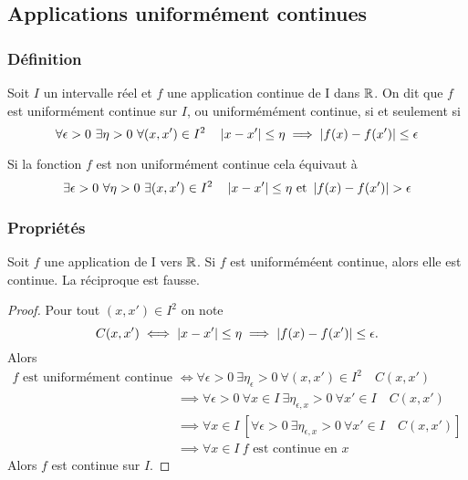 \subsection{Applications uniformément continues}

\subsubsection{Définition}

\begin{defdef}
  Soit $I$ un intervalle réel et $f$ une application continue de I dans $\mathbb{R}$. On dit que $f$ est uniformément continue sur $I$, ou uniformémément continue, si et seulement si
  \begin{equation}
    \forall \epsilon > 0 \ \exists \eta > 0 \ \forall (x,x') \in I^2 \quad \abs{x-x'} \leq \eta \implies \abs{f(x)-f(x')} \leq \epsilon
  \end{equation}
\end{defdef}
Si la fonction $f$ est non uniformément continue cela équivaut à
\begin{equation}
  \exists \epsilon > 0 \ \forall \eta > 0 \ \exists (x,x') \in I^2 \quad \abs{x-x'} \leq \eta \text{~et~} \abs{f(x)-f(x')} > \epsilon
\end{equation}

\subsubsection{Propriétés}

\begin{theo}
  Soit $f$ une application de I vers $\mathbb{R}$. Si $f$ est uniforméméent continue, alors elle est continue. La réciproque est fausse.
\end{theo}
\begin{proof}
  Pour tout $(x,x') \in I^2$ on note
  \begin{equation}
    C(x,x') \iff \left\lvert x-x'\right\rvert \leq \eta \implies \left\lvert f(x)-f(x')\right\rvert \leq \epsilon.
  \end{equation}
  Alors
  \begin{align}
    f \text{~est uniformément continue} &\iff \forall \epsilon > 0 \ \exists \eta_{\epsilon} > 0 \ \forall (x,x') \in I^2 \quad C(x,x')\\
    &\implies \forall \epsilon > 0 \ \forall x \in I \ \exists \eta_{\epsilon, x} > 0 \ \forall x' \in I \quad C(x,x')\\
    &\implies \forall x \in I \ \left[\forall \epsilon > 0 \ \exists \eta_{\epsilon, x} > 0 \ \forall x' \in I \quad C(x,x')\right]\\
    &\implies \forall x \in I \ f \text{~est continue en } x 
  \end{align}
Alors $f$ est continue sur $I$.
\end{proof}

